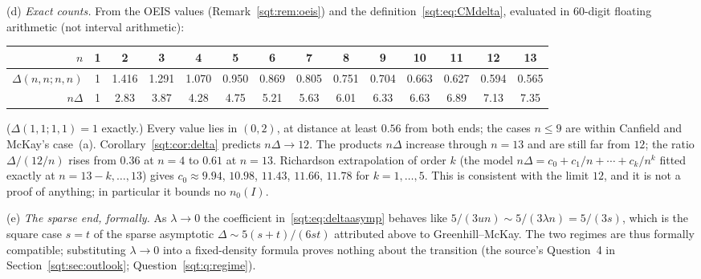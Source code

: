 \begin{remark}
(d) \emph{Exact counts.} From the OEIS values (Remark~\ref{sqt:rem:oeis}) and
the definition~\eqref{sqt:eq:CMdelta}, evaluated in 60-digit floating
arithmetic (not interval arithmetic):
\begin{center}\footnotesize\setlength{\tabcolsep}{3pt}
\begin{tabular}{@{}r*{13}{c}@{}}
\toprule
$n$ & 1&2&3&4&5&6&7&8&9&10&11&12&13\\
\midrule
$\Delta(n,n;n,n)$ & 1&1.416&1.291&1.070&0.950&0.869&0.805&0.751&0.704&0.663&0.627&0.594&0.565\\
$n\Delta$ & 1&2.83&3.87&4.28&4.75&5.21&5.63&6.01&6.33&6.63&6.89&7.13&7.35\\
\bottomrule
\end{tabular}
\end{center}
($\Delta(1,1;1,1)=1$ exactly.) Every value lies in $(0,2)$, at distance at
least $0.56$ from both ends; the cases $n\le9$ are within Canfield and
McKay's case~(a). Corollary~\ref{sqt:cor:delta} predicts $n\Delta\to12$.
The products $n\Delta$ increase through $n=13$ and are still far from $12$;
the ratio $\Delta/(12/n)$ rises from $0.36$ at $n=4$ to $0.61$ at $n=13$.
Richardson extrapolation of order $k$ (the model
$n\Delta=c_0+c_1/n+\cdots+c_k/n^k$ fitted exactly at $n=13-k,\ldots,13$)
gives $c_0\approx9.94$, $10.98$, $11.43$, $11.66$, $11.78$ for $k=1,\ldots,5$.
This is consistent with the limit $12$, and it is not a proof of anything;
in particular it bounds no $n_0(I)$.

(e) \emph{The sparse end, formally.} As $\lambda\to0$ the coefficient
in~\eqref{sqt:eq:deltaasymp} behaves like $5/(3un)\sim5/(3\lambda n)=5/(3s)$,
which is the square case $s=t$ of the sparse asymptotic
$\Delta\sim5(s+t)/(6st)$ attributed above to Greenhill--McKay. The two
regimes are thus formally compatible; substituting $\lambda\to0$ into a
fixed-density formula proves nothing about the transition (the source's
Question~4 in Section~\ref{sqt:sec:outlook}; Question~\ref{sqt:q:regime}).
\end{remark}
